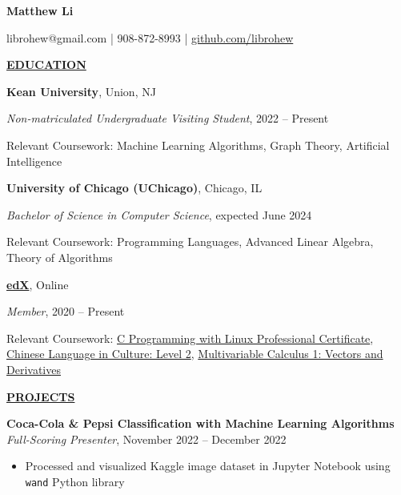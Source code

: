 \documentclass[
]{article}
\author{}
\date{\vspace{-2.5em}}
\providecommand{\tightlist}{%
  \setlength{\itemsep}{0pt}\setlength{\parskip}{0pt}}
\begin{document}

\begin{center}

\textbf{Matthew Li}

\end{center}

\begin{center}
librohew@gmail.com | 908-872-8993 | \href{https://www.github.com/librohew}{github.com/librohew}   
\end{center}

\textbf{\underline{EDUCATION}}

\textbf{Kean University}, Union, NJ

\emph{Non-matriculated Undergraduate Visiting Student}, 2022 -- Present

Relevant Coursework: Machine Learning Algorithms, Graph Theory, Artificial Intelligence 

\textbf{University of Chicago (UChicago)}, Chicago, IL

\emph{Bachelor of Science in Computer Science}, expected June 2024


Relevant Coursework: %
Programming Languages,
Advanced Linear Algebra, %
Theory of Algorithms

\href{https://www.edx.org/}{\textbf{edX}}, Online

\emph{Member}, 2020 -- Present

Relevant Coursework: 
\href{https://credentials.edx.org/credentials/1782d3571b2945de9b421230968ace62/}{C Programming with Linux Professional Certificate},
\href{https://courses.edx.org/certificates/dfd4b97d29cd408a985d6453a40d5424}{Chinese Language in Culture: Level 2}, 
\href{https://courses.edx.org/certificates/427a45b7df034c2a9fb085b0993bdec0}{Multivariable Calculus 1: Vectors and Derivatives} 

\textbf{\underline{PROJECTS}}

\textbf{Coca-Cola \& Pepsi Classification with Machine Learning Algorithms} \\
\emph{Full-Scoring Presenter}, November 2022 -- December 2022

\begin{itemize}
\tightlist
\item
Processed and visualized Kaggle image dataset in Jupyter Notebook using \texttt{wand} Python library 
\end{itemize}
\end{document}
